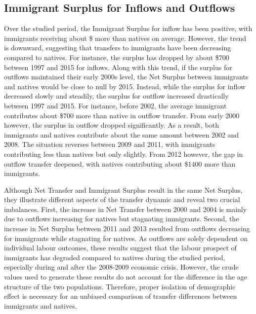 \subsection{Immigrant Surplus for Inflows and Outflows}
Over the studied period, the Immigrant Surplus for inflow has been positive, with immigrants receiving about \$ more than natives on average.
However, the trend is downward, suggesting that transfers to immigrants have been decreasing compared to natives.
For instance, the surplus has dropped by about \$700 between 1997 and 2015 for inflows. Along with this trend, if the surplus for outflows maintained their early 2000s level, the Net Surplus between immigrants and natives would be close to null by 2015.
Instead, while the surplus for inflow decreased slowly and steadily, the surplus for outflow increased drastically between 1997 and 2015.
For instance, before 2002, the average immigrant contributes about \$700 more than native in outflow transfer.
From early 2000 however, the surplus in outflow dropped significantly. As a result, both immigrants and natives contribute about the same amount between 2002 and 2008.
The situation reverses between 2009 and 2011, with immigrants contributing less than natives but only slightly.
From 2012 however, the gap in outflow transfer deepened, with natives contributing about \$1400 more than immigrants.

\vspace{0.7em}\par
Although Net Transfer and Immigrant Surplus result in the same Net Surplus, they illustrate different aspects of the transfer dynamic and reveal two crucial imbalances.
First, the increase in Net Transfer between 2000 and 2004 is mainly due to outflows increasing for natives but stagnating immigrants.
Second, the increase in Net Surplus between 2011 and 2013 resulted from outflows decreasing for immigrants while stagnating for natives.
As outflows are solely dependent on individual labour outcomes, these results suggest that the labour prospect of immigrants has degraded compared to natives during the studied period, especially during and after the 2008-2009 economic crisis.
However, the crude values used to generate these results do not account for the difference in the age structure of the two populations.
Therefore, proper isolation of demographic effect is necessary for an unbiased comparison of transfer differences between immigrants and natives.















